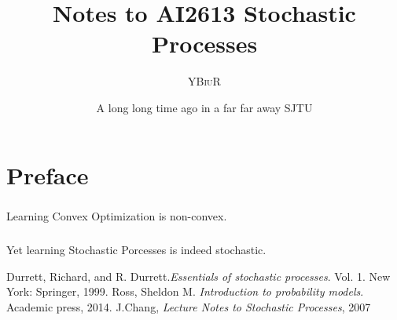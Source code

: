 \documentclass[oneside]{book}
\title{Notes to AI2613 Stochastic Processes}
\author{\textsc{YBiuR}}
\date{A long long time ago in a far far away SJTU}
\theoremstyle{definition}
\theoremstyle{remark}
\begin{document}
\setlength{\parskip}{1em}
\setlength{\parindent}{0em}

\frontmatter
\maketitle
\chapter*{Preface}
\paragraph{}Learning Convex Optimization is non-convex.
\paragraph{}Yet learning Stochastic Porcesses is indeed stochastic.
\mainmatter
\tableofcontents
\begin{spacing}{1.2}






\begin{thebibliography}{9}
     Durrett, Richard, and R. Durrett.\textit{Essentials of stochastic processes}. Vol. 1. New York: Springer, 1999.
     Ross, Sheldon M. \textit{Introduction to probability models}. Academic press, 2014.
     J.Chang, \textit{Lecture Notes to Stochastic Processes}, 2007
\end{thebibliography}

\end{spacing}
\end{document}
